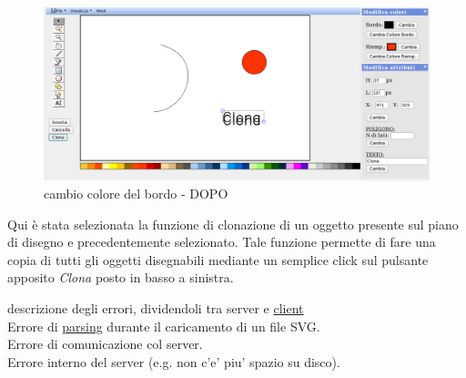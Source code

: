 \begin{figure}[!ht]
\centering
\includegraphics[scale=0.4]{images/clona_dopo.png}
\caption{cambio colore del bordo  - DOPO}
\end{figure} 

\vspace{100pt}
Qui \`e stata selezionata la funzione di clonazione di un oggetto presente sul piano di disegno e precedentemente selezionato. Tale funzione permette di fare una copia di tutti gli oggetti disegnabili mediante un semplice click sul pulsante apposito \textit{Clona} posto in basso a sinistra. \\


descrizione degli errori, dividendoli tra server e \underline{client}\\
Errore di \underline{parsing} durante il caricamento di un file SVG.\\
Errore di comunicazione col server. \\
Errore interno del server (e.g. non c'e' piu' spazio su disco).\\


